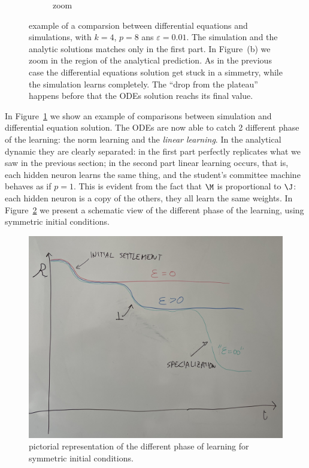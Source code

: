 \begin{figure}
\begin{subfigure}{0.495\textwidth}
    \caption{zoom}
  \end{subfigure}
  \caption{
    example of a comparsion between differential equations and simulations, with \(k=4\), \(p=8\) ans \(\varepsilon=0.01\).
    The simulation and the analytic solutions matches only in the first part.
    In Figure~(b) we zoom in the region of the analytical prediction.
    As in the previous case the differential equations solution get stuck in a simmetry,
    while the simulation learns completely. The ``drop from the plateau'' happens before 
    that the ODEs solution reachs its final value. 
  }
  \label{fig:example-small-eps}
\end{figure}

In Figure~\ref{fig:example-small-eps} we show an example of comparisons between simulation
and differential equation solution. The ODEs are now able to catch 2 different phase of 
the learning: the norm learning and the \emph{linear learning}. In the analytical dynamic
they are clearly separated: in the first part perfectly replicates what we saw in the previous section;
in the second part linear learning occurs, that is, each hidden neuron learns the same thing,
and the student's committee machine behaves as if \(p=1\).
This is evident from the fact that \(\M\) is proportional to \(\J\):
each hidden neuron is a copy of the others, they all learn the same weights.
In Figure~\ref{fig:pictorial-symmetric-learning} we present a schematic view of the different phase of the learning,
using symmetric initial conditions.
\begin{figure}
  \centering
  \includegraphics[width=.7\textwidth]{figures/symmetric-ic-expected-plateaus.jpg}
  
  \caption{
    pictorial representation of the different phase of learning for symmetric initial conditions.
  }
  \label{fig:pictorial-symmetric-learning}
\end{figure}

